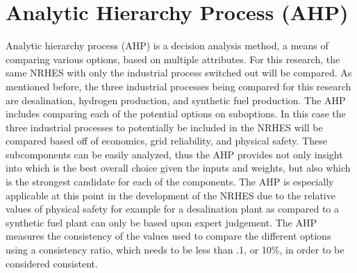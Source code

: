 \documentclass[12pt]{UIdahoMastersThesis}
\begin{document}
\section{Analytic Hierarchy Process (AHP)}
Analytic hierarchy process (AHP) is a decision analysis method, a means of comparing various options, based on multiple attributes. For this research, the same NRHES with only the industrial process switched out will be compared. As mentioned before, the three industrial processes being compared for this research are desalination, hydrogen production, and synthetic fuel production. The AHP includes comparing each of the potential options on suboptions. In this case the three industrial processes to potentially be included in the NRHES will be compared based off of economics, grid reliability, and physical safety. These subcomponents can be easily analyzed, thus the AHP provides not only insight into which is the best overall choice given the inputs and weights, but also which is the strongest candidate for each of the components. The AHP is especially applicable at this point in the development of the NRHES due to the relative values of physical safety for example for a desalination plant as compared to a synthetic fuel plant can only be based upon expert judgement. The AHP measures the consistency of the values used to compare the different options using a consistency ratio, which needs to be less than .1, or 10\%, in order to be considered consistent.
\end{document}
